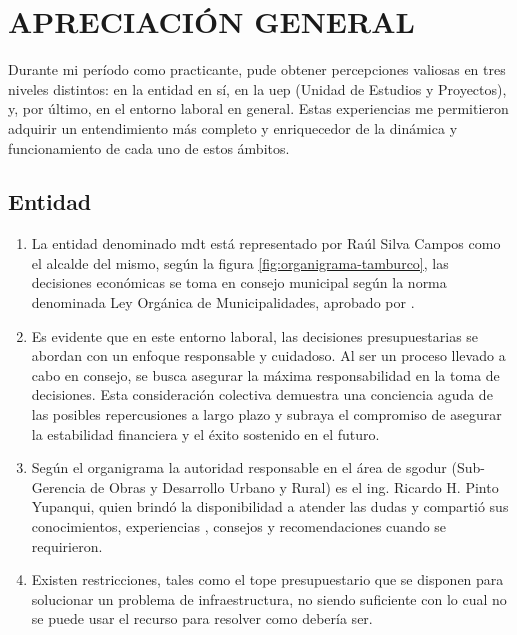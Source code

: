\chapter{APRECIACIÓN GENERAL}
Durante mi período como practicante, pude obtener percepciones valiosas en tres niveles distintos: en la entidad en sí, en la \acrshort{uep} (Unidad de Estudios y Proyectos), y, por último, en el entorno laboral en general. Estas experiencias me permitieron adquirir un entendimiento más completo y enriquecedor de la dinámica y funcionamiento de cada uno de estos ámbitos.
\section{Entidad}
\begin{enumerate}
	\item La entidad denominado \acrlong{mdt} está representado por Raúl Silva Campos como el alcalde del mismo, según la figura \ref{fig:organigrama-tamburco}, las decisiones económicas se toma en consejo municipal según la norma denominada Ley Orgánica de Municipalidades, aprobado por  \cite{CongresoRepublica2003}.
	\item Es evidente que en este entorno laboral, las decisiones presupuestarias se abordan con un enfoque responsable y cuidadoso. Al ser un proceso llevado a cabo en consejo, se busca asegurar la máxima responsabilidad en la toma de decisiones. Esta consideración colectiva demuestra una conciencia aguda de las posibles repercusiones a largo plazo y subraya el compromiso de asegurar la estabilidad financiera y el éxito sostenido en el futuro.
	\item Según el organigrama la autoridad responsable en el área de \acrshort{sgodur} (Sub-Gerencia de Obras y Desarrollo Urbano y Rural) es el ing. Ricardo H. Pinto Yupanqui, quien brindó la disponibilidad a atender las dudas y compartió sus conocimientos,  experiencias , consejos y recomendaciones cuando se requirieron.

	\item Existen restricciones, tales como el tope presupuestario que se disponen para solucionar un problema de infraestructura, no siendo suficiente con lo cual no se puede usar el recurso para resolver como debería ser.
\end{enumerate}
